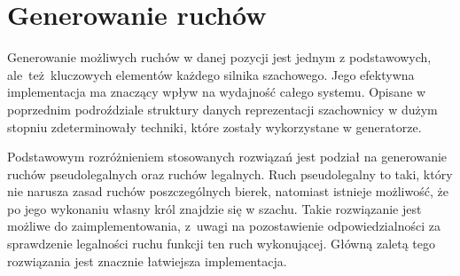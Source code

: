 \newpage
\section{Generowanie ruchów}
\label{sec:generowanie-ruchow}

Generowanie możliwych ruchów w danej pozycji jest jednym z podstawowych, ale~też~kluczowych elementów każdego silnika szachowego.
Jego efektywna implementacja ma znaczący wpływ na wydajność całego systemu.
Opisane w poprzednim podroździale struktury danych reprezentacji szachownicy w dużym stopniu zdeterminowały techniki, które zostały wykorzystane w generatorze.

Podstawowym rozróżnieniem stosowanych rozwiązań jest podział na generowanie ruchów pseudolegalnych oraz ruchów legalnych.
Ruch pseudolegalny to taki, który nie narusza zasad ruchów poszczególnych bierek, natomiast istnieje możliwość, że po jego wykonaniu własny król znajdzie się w szachu.
Takie rozwiązanie jest możliwe do zaimplementowania, z~uwagi na pozostawienie odpowiedzialności za sprawdzenie legalności ruchu funkcji ten ruch wykonującej.
Główną zaletą tego rozwiązania jest znacznie łatwiejsza implementacja.




